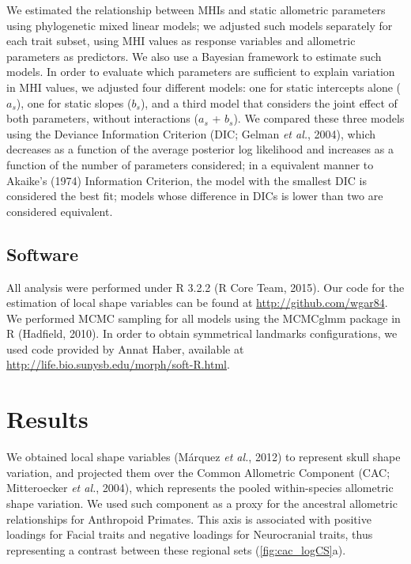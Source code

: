 \documentclass[12pt,twoside]{report}
\begin{document}
We estimated the relationship between MHIs and static allometric
parameters using phylogenetic mixed linear models; we adjusted such
models separately for each trait subset, using MHI values as response
variables and allometric parameters as predictors. We also use a
Bayesian framework to estimate such models. In order to evaluate which
parameters are sufficient to explain variation in MHI values, we
adjusted four different models: one for static intercepts alone ($a_s$),
one for static slopes ($b_s$), and a third model that considers the
joint effect of both parameters, without interactions ($a_s$ + $b_s$).
We compared these three models using the Deviance Information Criterion
(DIC; Gelman \emph{et al.}, 2004), which decreases as a function of the
average posterior log likelihood and increases as a function of the
number of parameters considered; in a equivalent manner to Akaike's
(1974) Information Criterion, the model with the smallest DIC is
considered the best fit; models whose difference in DICs is lower than
two are considered equivalent.

\subsection{Software}\label{software-1}

All analysis were performed under R 3.2.2 (R Core Team, 2015). Our code
for the estimation of local shape variables can be found at
\url{http://github.com/wgar84}. We performed MCMC sampling for all
models using the MCMCglmm package in R (Hadfield, 2010). In order to
obtain symmetrical landmarks configurations, we used code provided by
Annat Haber, available at
\url{http://life.bio.sunysb.edu/morph/soft-R.html}.

\section{Results}\label{results-1}

We obtained local shape variables (Márquez \emph{et al.}, 2012) to
represent skull shape variation, and projected them over the Common
Allometric Component (CAC; Mitteroecker \emph{et al.}, 2004), which
represents the pooled within-species allometric shape variation. We used
such component as a proxy for the ancestral allometric relationships for
Anthropoid Primates. This axis is associated with positive loadings for
Facial traits and negative loadings for Neurocranial traits, thus
representing a contrast between these regional sets
(\autoref{fig:cac_logCS}a).
\end{document}
